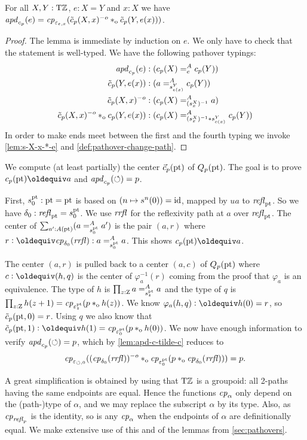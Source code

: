 \documentclass[a4,12pt]{amsart}
\begin{document}
\begin{lemma}\label{lem:apd-c-tilde-c}
For all $X,Y:{\mathrm{T}\mathbb{Z}}$, $e: X=Y$ and $x:X$ we have
$\mathop{{\it apd}_{c_p}}(e) = \mathit{cp}_{\varepsilon_{e,x}}
(\tilde c_p(X,x)^{-o}*_{\mathrm{o}} \tilde c_p(Y,e(x)))$.
\end{lemma}
\begin{proof}
The lemma is immediate by induction on $e$.
We only have to check that the statement is well-typed.
We have the following pathover typings:
\begin{align*}
\mathop{{\it apd}_{c_p}}(e) &: (c_p(X) =^A_e c_p(Y))\\
\tilde c_p(Y,e(x)) &:  (a =^A_{s^Y_{e(x)}} c_p(Y))\\
\tilde c_p(X,x)^{-o} &: (c_p(X) =^A_{(s^X_x)^{-1}} a)\\
\tilde c_p(X,x)^{-o} *_{\mathrm{o}} c_p(Y,e(x)) &: 
     (c_p(X) =^A_{(s^X_x)^{-1}* s^Y_{e(x)}} c_p(Y))\\
\end{align*}
In order to make ends meet between the first and the fourth typing
we invoke \cref{lem:s-X-x-*-e} and \cref{def:pathover-change-path}.
\end{proof}

We compute (at least partially) the center $\vec c_p({\mathord{\mathrm{pt}}})$ of $Q_p({\mathord{\mathrm{pt}}})$.
The goal is to prove $c_p(\pt)\jdeq a$ and $\mathop{{\it apd}_{c_p}}(\circlearrowleft)=p$.

First, $s^{\mathord{\mathrm{pt}}}_0: {\mathord{\mathrm{pt}}} = {\mathord{\mathrm{pt}}}$ is based on $(n\mapsto s^n(0)) = \mathord{\mathrm{id}}$, 
mapped by $ua$ to $\mathop{{\it refl}_{{\mathord{\mathrm{pt}}}}}$. So we have $\delta_0 : \mathop{{\it refl}_{{\mathord{\mathrm{pt}}}}} = s^{\mathord{\mathrm{pt}}}_0$.
We use $\mathit{rrfl}$ for the reflexivity path at $a$ over $\mathop{{\it refl}_{{\mathord{\mathrm{pt}}}}}$.
The center of $\sum_{a':A({\mathord{\mathrm{pt}}})} (a =^A_{s^{\mathord{\mathrm{pt}}}_0} a')$ is the pair
$(a,r)$ where $r \defeq \cp{\delta_0}(\rrfl): a =^A_{s^\pt_0} a$.
This shows $c_p(\pt)\jdeq a$.

The center $(a,r)$ is pulled back to a center $(a,c)$ of $Q_p({\mathord{\mathrm{pt}}})$ 
where $c\defeq(h,q)$ is the center of $\varphi_{a}^{-1}(r)$ coming 
from the proof that $\varphi_{a}$ is an equivalence.
The type of $h$ is $\prod_{z:\mathrm{Z}} a =^A_{s^{\mathord{\mathrm{pt}}}_z} a$ and
the type of $q$ is $\prod_{z:\mathrm{Z}} h(z+1) = \mathit{cp}_{\varepsilon^{\mathord{\mathrm{pt}}}_z}(p *_{\mathrm{o}} h(z))$.
We know $\varphi_{a}(h,q) \defeq h(0) = r$, so $\tilde c_p({\mathord{\mathrm{pt}}},0) = r$.
Using $q$ we also know that 
$\tilde c_p(\pt,1) \defeq h(1) = \cp{\varepsilon^\pt_0}(p \cto h(0))$.
We now have enough information to verify $\mathop{{\it apd}_{c_p}}(\circlearrowleft)=p$,
which by \cref{lem:apd-c-tilde-c} reduces to 
\[
\mathit{cp}_{\varepsilon_{\circlearrowleft,0}}
((\mathit{cp}_{\delta_0}(\mathit{rrfl}))^{-o}*_{\mathrm{o}} 
\mathit{cp}_{\varepsilon^{\mathord{\mathrm{pt}}}_0}(p *_{\mathrm{o}} \mathit{cp}_{\delta_0}(\mathit{rrfl}))) = p.
\]


A great simplification is obtained by using that ${\mathrm{T}\mathbb{Z}}$ is a groupoid:
all 2-paths having the same endpoints are equal.
Hence the functions $\mathit{cp}_{\alpha}$ only depend on the (path-)type
of $\alpha$, and we may replace the subscript $\alpha$ by its type.
Also, as $\mathit{cp}_{\mathop{{\it refl}_{p}}}$ is the identity, so is any $\mathit{cp}_{\alpha}$
when the endpoints of $\alpha$ are definitionally equal. 
We make extensive use of this and of the lemmas from \cref{sec:pathovers}.
\end{document}
